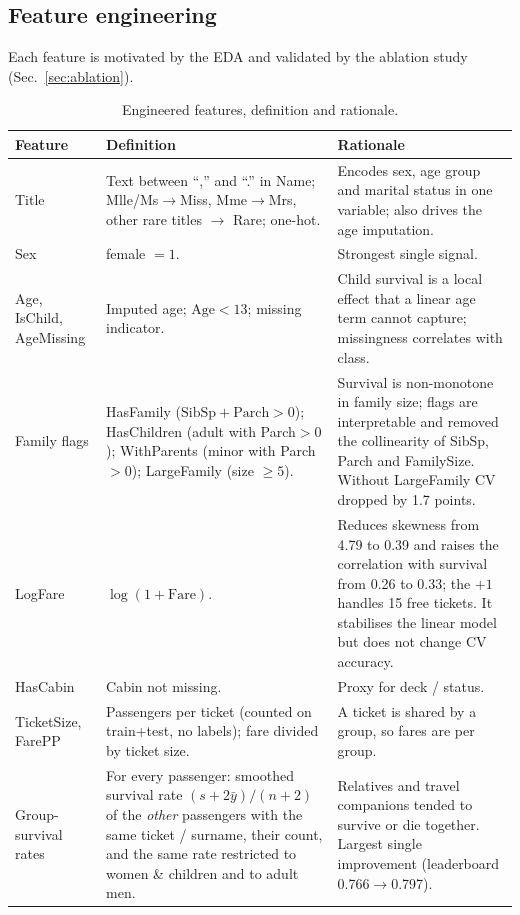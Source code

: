\documentclass[10pt,twocolumn]{article}
\begin{document}
\subsection{Feature engineering}\label{sec:fe}
Each feature is motivated by the EDA and validated by the ablation study (Sec.~\ref{sec:ablation}).
\begin{table}[t]
\centering\small
\caption{Engineered features, definition and rationale.}
\label{tab:fe}
\begin{tabular}{p{2.6cm}p{6.5cm}p{7.2cm}}
\toprule
Feature & Definition & Rationale \\
\midrule
Title & Text between ``,'' and ``.'' in Name; Mlle/Ms$\to$Miss, Mme$\to$Mrs, other rare titles $\to$ Rare; one-hot. & Encodes sex, age group and marital status in one variable; also drives the age imputation. \\
Sex & female $=1$. & Strongest single signal. \\
Age, IsChild, AgeMissing & Imputed age; $\text{Age}<13$; missing indicator. & Child survival is a local effect that a linear age term cannot capture; missingness correlates with class. \\
Family flags & HasFamily ($\text{SibSp}+\text{Parch}>0$); HasChildren (adult with Parch$>0$); WithParents (minor with Parch$>0$); LargeFamily (size $\ge5$). & Survival is non-monotone in family size; flags are interpretable and removed the collinearity of SibSp, Parch and FamilySize. Without LargeFamily CV dropped by 1.7 points. \\
LogFare & $\log(1+\text{Fare})$. & Reduces skewness from 4.79 to 0.39 and raises the correlation with survival from 0.26 to 0.33; the $+1$ handles 15 free tickets. It stabilises the linear model but does not change CV accuracy. \\
HasCabin & Cabin not missing. & Proxy for deck / status. \\
TicketSize, FarePP & Passengers per ticket (counted on train+test, no labels); fare divided by ticket size. & A ticket is shared by a group, so fares are per group. \\
Group-survival rates & For every passenger: smoothed survival rate $(s+2\bar y)/(n+2)$ of the \emph{other} passengers with the same ticket / surname, their count, and the same rate restricted to women \& children and to adult men. & Relatives and travel companions tended to survive or die together. Largest single improvement (leaderboard 0.766$\to$0.797). \\
\bottomrule
\end{tabular}
\end{table}
\end{document}
